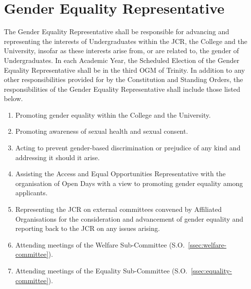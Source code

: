 \section{Gender Equality Representative}
\npara The Gender Equality Representative shall be responsible for advancing and representing the interests of Undergraduates within the JCR, the College and the University, insofar as these interests arise from, or are related to, the gender of Undergraduates.
\npara In each Academic Year, the Scheduled Election of the Gender Equality Representative shall be in the third OGM of Trinity.
\npara In addition to any other responsibilities provided for by the Constitution and Standing Orders, the responsibilities of the Gender Equality Representative shall include those listed below.
\begin{enumerate}
	\item Promoting gender equality within the College and the University.     
	\item Promoting awareness of sexual health and sexual consent.     
	\item Acting to prevent gender-based discrimination or prejudice of any kind and addressing it should it arise.     
	\item Assisting the Access and Equal Opportunities Representative with the organisation of Open Days with a view to promoting gender equality among applicants.     
	\item Representing the JCR on external committees convened by Affiliated Organisations for the consideration and advancement of gender equality and reporting back to the JCR on any issues arising.     
	\item Attending meetings of the Welfare Sub-Committee (S.O.~\ref{ssec:welfare-committee}).     
	\item Attending meetings of the Equality Sub-Committee (S.O.~\ref{ssec:equality-committee}).
\end{enumerate}
